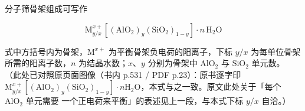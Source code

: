 分子筛骨架组成可写作

\begin{equation}
\label{eq:zeolite}
\mathrm{M}^{x+}_{y/x}\left[\left(\mathrm{AlO}_{2}\right)_{y}
\left(\mathrm{SiO}_{2}\right)_{1-y}\right]\cdot n\,\mathrm{H}_{2}\mathrm{O}
\end{equation}

式中方括号内为骨架，$\mathrm{M}^{x+}$ 为平衡骨架负电荷的阳离子，下标 $y/x$ 为每单位骨架
所需的阳离子数，$n$ 为结晶水数；$x$、$y$ 分别为骨架中 $\mathrm{AlO}_{2}$ 与
$\mathrm{SiO}_{2}$ 单元数。
（此处已对照原页面图像（书内 p.531 / PDF p.23）：原书逐字印
$\mathrm{M}^{x+}_{y/x}[(\mathrm{AlO}_{2})_{y}(\mathrm{SiO}_{2})_{1-y}]\cdot
n\mathrm{H}_{2}\mathrm{O}$，本式与之一致。原文此处关于「每个 $\mathrm{AlO}_{2}$ 单元需要
一个正电荷来平衡」的表述见上一段，与本式下标 $y/x$ 自洽。）

